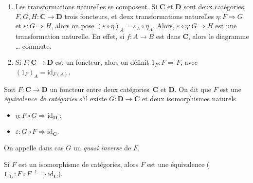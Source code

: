 \begin{rmk}
  \begin{enumerate}
    \item Les transformations naturelles se composent.
      Si $\mathbf{C}$ et $\mathbf{D}$ sont deux catégories, $F,G,H : \mathbf{C} \to \mathbf{D}$  trois foncteurs, et deux transformations naturelles $\eta : F \Rightarrow G$ et $\varepsilon : G \Rightarrow H$, alors on pose $(\varepsilon \circ \eta)_A = \varepsilon_A \circ \eta_A$.
      Alors, $\varepsilon \circ \eta : G \Rightarrow H$ est une transformation naturelle.
      En effet, si $f : A \to B$ est dans $\mathbf{C}$, alors le diagramme \ldots
      commute.
    \item Si $F : \mathbf{C} \to \mathbf{D}$ est un foncteur, alors on définit $1_F : F \Rightarrow F$, avec $(1_F)_A = \mathrm{id}_{F(A)}$.
  \end{enumerate}
\end{rmk}

\begin{defn}
  Soit $F : \mathbf{C} \to \mathbf{D}$ un foncteur entre deux catégories~$\mathbf{C}$ et $\mathbf{D}$.
  On dit que $F$ est une \textit{équivalence de catégories} s'il existe $G : \mathbf{D} \to \mathbf{C}$ et deux isomorphismes naturels 
  \begin{itemize}
    \item $\eta : F \circ G \Rightarrow \mathrm{id}_\mathbf{D}$ ;
    \item $\varepsilon : G \circ F \Rightarrow \mathrm{id}_\mathbf{C}$.
  \end{itemize}

  On appelle dans cas $G$ un \textit{quasi inverse} de $F$.

  Si $F$ est un isomorphisme de catégories, alors $F$ est une équivalence ($1_{\mathrm{id}_F} : F \circ F^{-1} \Rightarrow \mathrm{id}_\mathbf{C}$).
\end{defn}

